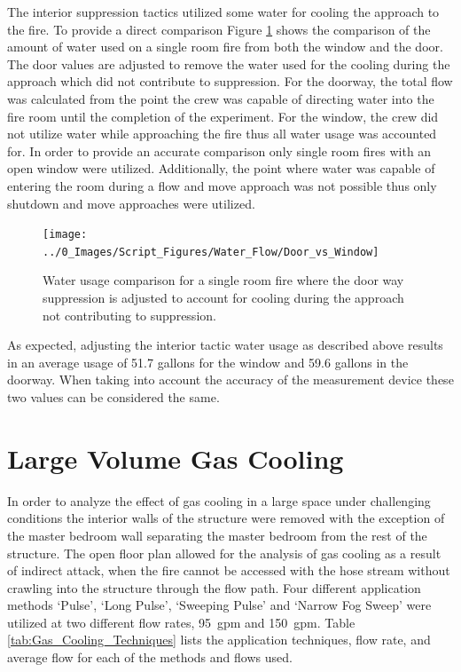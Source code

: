 \documentclass[12pt,oneside]{book}
\begin{document}
The interior suppression tactics utilized some water for cooling the approach to the fire. To provide a direct comparison Figure \ref{fig:Door_vs_window} shows the comparison of the amount of water used on a single room fire from both the window and the door. The door values are adjusted to remove the water used for the cooling during the approach which did not contribute to suppression. For the doorway, the total flow was calculated from the point the crew was capable of directing water into the fire room until the completion of the experiment. For the window, the crew did not utilize water while approaching the fire thus all water usage was accounted for. In order to provide an accurate comparison only single room fires with an open window were utilized. Additionally, the point where water was capable of entering the room during a flow and move approach was not possible thus only shutdown and move approaches were utilized.

\begin{figure}[H]
\centering
\texttt{[image: ../0\_Images/Script\_Figures/Water\_Flow/Door\_vs\_Window]}
\caption[Water Usage For Single Room]{Water usage comparison for a single room fire where the door way suppression is adjusted to account for cooling during the approach not contributing to suppression.}
\label{fig:Door_vs_window}
\end{figure}

As expected, adjusting the interior tactic water usage as described above results in an average usage of 51.7 gallons for the window and 59.6 gallons in the doorway. When taking into account the accuracy of the measurement device these two values can be considered the same.  

\section{Large Volume Gas Cooling}
In order to analyze the effect of gas cooling in a large space under challenging conditions the interior walls of the structure were removed with the exception of the master bedroom wall separating the master bedroom from the rest of the structure. The open floor plan allowed for the analysis of gas cooling as a result of indirect attack, when the fire cannot be accessed with the hose stream without crawling into the structure through the flow path. Four different application methods `Pulse', `Long Pulse', `Sweeping Pulse' and `Narrow Fog Sweep' were utilized at two different flow rates, 95~gpm and 150~gpm. Table \ref{tab:Gas_Cooling_Techniques} lists the application techniques, flow rate, and average flow for each of the methods and flows used. 
\end{document}
